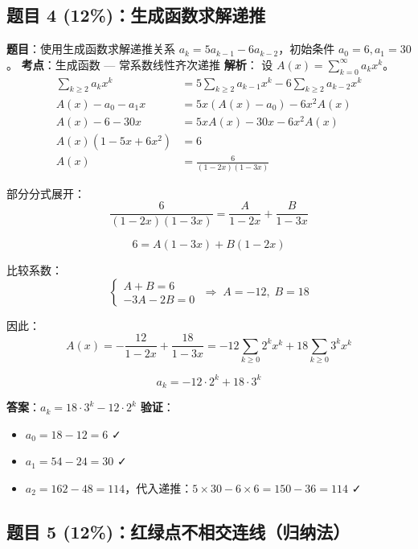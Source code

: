 \documentclass[10pt,a4paper,openany]{ctexbook}
\theoremstyle{definition}
\theoremstyle{remark}
\begin{document}
\subsection{题目 4 (12\%)：生成函数求解递推}

\textbf{题目}：使用生成函数求解递推关系 $a_k = 5a_{k-1} - 6a_{k-2}$，初始条件 $a_0 = 6, a_1 = 30$。
\textbf{考点}：生成函数 — 常系数线性齐次递推
\textbf{解析}：
设 $A(x) = \sum_{k=0}^\infty a_k x^k$。
\[
\begin{aligned}
\sum_{k \ge 2} a_k x^k &= 5 \sum_{k \ge 2} a_{k-1} x^k - 6 \sum_{k \ge 2} a_{k-2} x^k \\
A(x) - a_0 - a_1 x &= 5x(A(x) - a_0) - 6x^2 A(x) \\
A(x) - 6 - 30x &= 5xA(x) - 30x - 6x^2 A(x) \\
A(x)(1 - 5x + 6x^2) &= 6 \\
A(x) &= \frac{6}{(1 - 2x)(1 - 3x)}
\end{aligned}
\]

部分分式展开：
\[
 \frac{6}{(1-2x)(1-3x)} = \frac{A}{1-2x} + \frac{B}{1-3x} 
\]

\[
 6 = A(1-3x) + B(1-2x) 
\]

比较系数：
\[
\begin{cases}
A + B = 6 \\
-3A - 2B = 0
\end{cases}
\;\Rightarrow\; A = -12,\; B = 18
\]

因此：
\[
 A(x) = -\frac{12}{1-2x} + \frac{18}{1-3x} = -12\sum_{k \ge 0} 2^k x^k + 18\sum_{k \ge 0} 3^k x^k 
\]

\[
 a_k = -12 \cdot 2^k + 18 \cdot 3^k 
\]

\textbf{答案}：$\boxed{a_k = 18 \cdot 3^k - 12 \cdot 2^k}$
\textbf{验证}：
\begin{itemize}
\item $a_0 = 18 - 12 = 6$ ✓
\item $a_1 = 54 - 24 = 30$ ✓
\item $a_2 = 162 - 48 = 114$，代入递推：$5 \times 30 - 6 \times 6 = 150 - 36 = 114$ ✓

\end{itemize}

\vspace{-2pt}

\subsection{题目 5 (12\%)：红绿点不相交连线（归纳法）}
\end{document}
